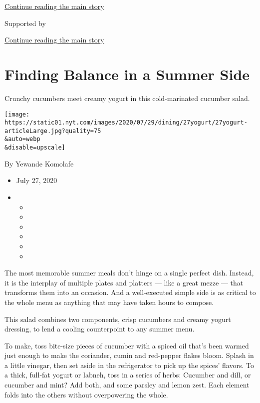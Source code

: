 \protect\hyperlink{after-top}{Continue reading the main story}

Supported by

\protect\hyperlink{after-sponsor}{Continue reading the main story}

\hypertarget{finding-balance-in-a-summer-side}{%
\section{Finding Balance in a Summer
Side}\label{finding-balance-in-a-summer-side}}

Crunchy cucumbers meet creamy yogurt in this cold-marinated cucumber
salad.

\texttt{[image: https://static01.nyt.com/images/2020/07/29/dining/27yogurt/27yogurt-articleLarge.jpg?quality=75\\\&auto=webp\\\&disable=upscale]}

By Yewande Komolafe

\begin{itemize}
\item
  July 27, 2020
\item
  \begin{itemize}
  \item
  \item
  \item
  \item
  \item
  \item
  \end{itemize}
\end{itemize}

The most memorable summer meals don't hinge on a single perfect dish.
Instead, it is the interplay of multiple plates and platters --- like a
great mezze --- that transforms them into an occasion. And a
well-executed simple side is as critical to the whole menu as anything
that may have taken hours to compose.

This salad combines two components, crisp cucumbers and creamy yogurt
dressing, to lend a cooling counterpoint to any summer menu.

To make, toss bite-size pieces of cucumber with a spiced oil that's been
warmed just enough to make the coriander, cumin and red-pepper flakes
bloom. Splash in a little vinegar, then set aside in the refrigerator to
pick up the spices' flavors. To a thick, full-fat yogurt or labneh, toss
in a series of herbs: Cucumber and dill, or cucumber and mint? Add both,
and some parsley and lemon zest. Each element folds into the others
without overpowering the whole.

